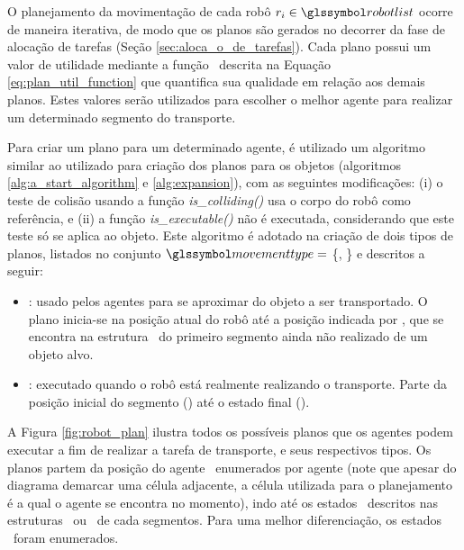
O planejamento da movimentação de cada robô $\robot{i} \in \sy{robotlist}$ ocorre de maneira iterativa, de modo que os planos são gerados no decorrer da fase de alocação de tarefas (Seção \ref{sec:aloca_o_de_tarefas}).
Cada plano possui um valor de utilidade mediante a função \ descrita na Equação \ref{eq:plan_util_function} que quantifica sua qualidade em relação aos demais planos.
Estes valores serão utilizados para escolher o melhor agente para realizar um determinado segmento do transporte.

Para criar um plano para um determinado agente, é utilizado um algoritmo similar ao utilizado para criação dos planos para os objetos (algoritmos \ref{alg:a_start_algorithm} e \ref{alg:expansion}), com as seguintes modificações: (i) o teste de colisão usando a função \emph{is\_colliding()} usa o corpo do robô como referência, e (ii) a função \emph{is\_executable()} não é executada, considerando que este teste só se aplica ao objeto.
Este algoritmo é adotado na criação de dois tipos de planos, listados no conjunto $\sy{movementtype} =$ \{\movementtypepremove, \movementtypemove\} e descritos a seguir:

\begin{itemize}
  \item \textbf{\movementtypepremove}: usado pelos agentes para se aproximar do objeto a ser transportado. O plano inicia-se na posição atual do robô até a posição indicada por \robotstate, que se encontra na estrutura \originstate\ do primeiro segmento ainda não realizado de um objeto alvo.
  \item \textbf{\movementtypemove}: executado quando o robô está realmente realizando o transporte. Parte da posição inicial do segmento (\originstate) até o estado final (\targetstate).
\end{itemize}

A Figura \ref{fig:robot_plan} ilustra todos os possíveis planos que os agentes podem executar a fim de realizar a tarefa de transporte, e seus respectivos tipos.
Os planos partem da posição do agente \robotinitialstate\ enumerados por agente (note que apesar do diagrama demarcar uma célula adjacente, a célula utilizada para o planejamento é a qual o agente se encontra no momento), indo até os estados \robotstate\ descritos nas estruturas \originstate\ ou \targetstate\ de cada segmentos.
Para uma melhor diferenciação, os estados \robotstate\ foram enumerados.

